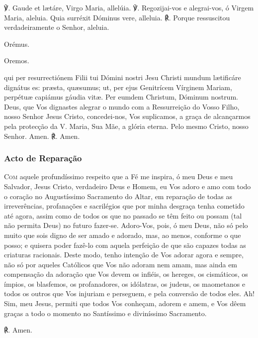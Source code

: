 \begin{nscenter}\emph{}\end{nscenter}

\begin{paracol}{2}
{\redx ℣.} Gaude et lætáre, Virgo Maria, allelúia.
\switchcolumn
{\redx ℣.} Regozijai-vos e alegrai-vos, ó Virgem Maria, aleluia.
 Quia surréxit Dóminus vere, alleluia.
\switchcolumn
{\redx ℟.} Porque ressuscitou verdadeiramente o Senhor, aleluia.
\switchcolumn*
\begin{nscenter} {\redx Orémus.} \end{nscenter}
\switchcolumn
\begin{nscenter} {\redx Oremos.} \end{nscenter}
\switchcolumn*
{}qui per resurrectiónem Filii tui Dómini nostri Jesu Christi mundum lætificáre dignátus es: præsta, quæsumus; ut, per ejus Genitrícem Vírginem Mariam, perpétuæ capiámus gáudia vitæ. Per eumdem Christum, Dóminum nostrum.
\switchcolumn
{}Deus, que Vos dignastes alegrar o mundo com a Ressurreição do Vosso Filho, nosso Senhor Jesus Cristo, concedei-nos, Vos suplicamos, a graça de alcançarmos pela protecção da V. Maria, Sua Mãe, a glória eterna. Pelo mesmo Cristo, nosso Senhor.
 Amen.
\switchcolumn
{\redx ℟.} Amen.
\end{paracol}

\subsubsection{Acto de Reparação}

\lettrine[lines=4,loversize=-.15,lraise=.15]{{\bg C}}{\redx om} aquele profundíssimo respeito que a Fé me inspira, ó meu Deus e meu Salvador, Jesus Cristo, verdadeiro Deus e Homem, eu Vos adoro e amo com todo o coração no Augustíssimo Sacramento do Altar, em reparação de todas as irreverências, profanações e sacrilégios que por minha desgraça tenha cometido até agora, assim como de todos os que no passado se têm feito ou possam (tal não permita Deus) no futuro fazer-se. Adoro-Vos, pois, ó meu Deus, não só pelo muito que sois digno de ser amado e adorado, mas, ao menos, conforme o que posso; e quisera poder fazê-lo com aquela perfeição de que são capazes todas as criaturas racionais. Deste modo, tenho intenção de Vos adorar agora e sempre, não só por aqueles Católicos que Vos não adoram nem amam, mas ainda em compensação da adoração que Vos devem os infiéis, os hereges, os cismáticos, os ímpios, os blasfemos, os profanadores, os idólatras, os judeus, os maometanos e todos os outros que Vos injuriam e perseguem, e pela conversão de todos eles. Ah! Sim, meu Jesus, permiti que todos Vos conheçam, adorem e amem, e Vos dêem graças a todo o momento no Santíssimo e diviníssimo Sacramento. \par
{\redx ℟.} Amen.

